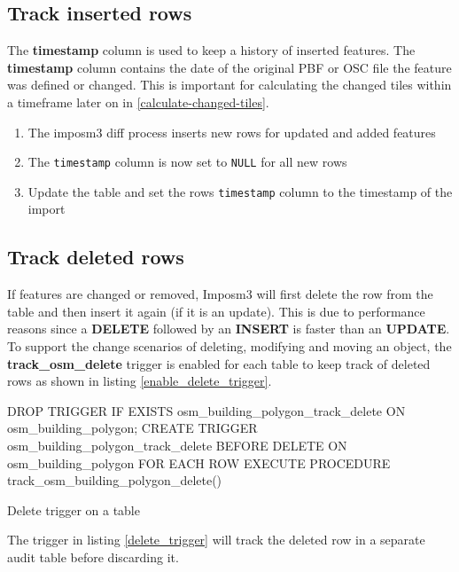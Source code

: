 \subsection{Track inserted rows}

The \textbf{timestamp} column is used to keep a history of inserted features. The \textbf{timestamp} column contains the date of the original PBF or OSC file the feature was defined or changed. This is important for calculating the changed tiles within a timeframe later on in \autoref{calculate-changed-tiles}.

\begin{enumerate}
   \item The imposm3 diff process inserts new rows for updated and added features
   \item The \texttt{timestamp} column is now set to \texttt{NULL} for all new rows
   \item Update the table and set the rows \texttt{timestamp} column to the timestamp of the import
\end{enumerate}

\subsection{Track deleted rows}

If \osm{} features are changed or removed, Imposm3 will first delete the row from the table and then insert it again (if it is an update). This is due to performance reasons since a \textbf{DELETE} followed by an \textbf{INSERT} is faster than an \textbf{UPDATE}.
 To support the change scenarios of deleting, modifying and moving an object, the \textbf{track\_osm\_delete} trigger is enabled for each table to keep track of deleted rows as shown in listing \autoref{enable_delete_trigger}.

\begin{listing}[H]
  \centering
  \begin{sqlcode}
    DROP TRIGGER IF EXISTS osm_building_polygon_track_delete ON osm_building_polygon;
    CREATE TRIGGER osm_building_polygon_track_delete
    BEFORE DELETE ON osm_building_polygon
    FOR EACH ROW EXECUTE PROCEDURE track_osm_building_polygon_delete()
  \end{sqlcode}
  \caption{Delete trigger on a table}
  \label{enable_delete_trigger}
\end{listing}

The trigger in listing \autoref{delete_trigger} will track the deleted row in a separate audit table before discarding it.

